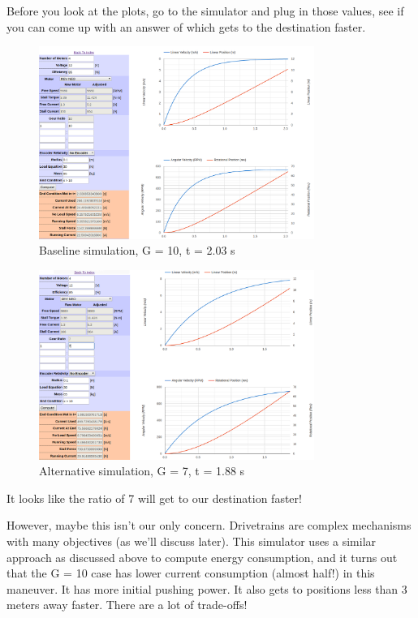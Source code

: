 Before you look at the plots, go to the simulator and plug in those values, see if you can come up with an answer of which gets to the destination faster.

\clearpage
	
	\begin{figure}[H] \centering
	\includegraphics[width=0.8\textwidth]{imgs/thsae_1.png}
	\caption{Baseline simulation, G = 10, t = 2.03 s}
	\end{figure}
	
	\begin{figure}[H] \centering
	\includegraphics[width=0.8\textwidth]{imgs/thsae_2.png}
	\caption{Alternative simulation, G = 7, t = 1.88 s}
	\end{figure}
	
	It looks like the ratio of 7 will get to our destination faster!
	
	However, maybe this isn't our only concern. Drivetrains are complex mechanisms with many objectives (as we'll discuss later). This simulator uses a similar approach as discussed above to compute energy consumption, and it turns out that the G = 10 case has lower current consumption (almost half!) in this maneuver. It has more initial pushing power. It also gets to positions less than 3 meters away faster. There are a lot of trade-offs!
	
